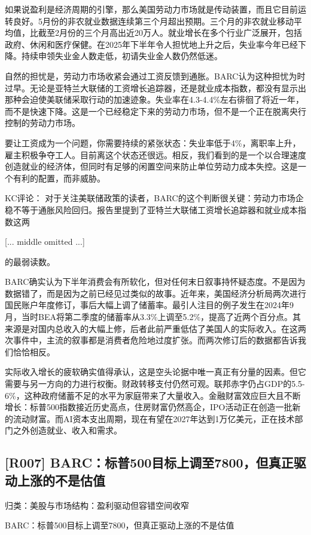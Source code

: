 \documentclass[11pt]{ctexart}
\begin{document}
如果说盈利是经济周期的引擎，那么美国劳动力市场就是传动装置，而且它目前运转良好。5月份的非农就业数据连续第三个月超出预期。三个月的非农就业移动平均值，比截至2月份的三个月高出近20万人。就业增长在多个行业广泛展开，包括政府、休闲和医疗保健。在2025年下半年令人担忧地上升之后，失业率今年已经下降。持续申领失业金人数走低，初请失业金人数仍然低迷。

自然的担忧是，劳动力市场收紧会通过工资反馈到通胀。BARC认为这种担忧为时过早。无论是亚特兰大联储的工资增长追踪器，还是就业成本指数，都没有显示出那种会迫使美联储采取行动的加速迹象。失业率在4.3-4.4\%左右徘徊了将近一年，而不是快速下降。这是一个已经稳定下来的劳动力市场，但不是一个正在脱离央行控制的劳动力市场。

要让工资成为一个问题，你需要持续的紧张状态：失业率低于4\%，离职率上升，雇主积极争夺工人。目前离这个状态还很远。相反，我们看到的是一个以合理速度创造就业的经济体，但同时有足够的闲置空间来防止单位劳动力成本失控。这是一个有利的配置，而非威胁。

KC评论： 对于关注美联储政策的读者，BARC的这个判断很关键：劳动力市场企稳不等于通胀风险回归。报告里提到了亚特兰大联储工资增长追踪器和就业成本指数这两

[... middle omitted ...]

的最弱读数。

BARC确实认为下半年消费会有所软化，但对任何末日叙事持怀疑态度。不是因为数据错了，而是因为之前已经见过类似的故事。近年来，美国经济分析局两次进行国民账户年度修订，事后大幅上调了储蓄率。最引人注目的例子发生在2024年9月，当时BEA将第二季度的储蓄率从3.3\%上调至5.2\%，提高了近两个百分点。其来源是对国内总收入的大幅上修，后者此前严重低估了美国人的实际收入。在这两次事件中，主流的叙事都是消费者危险地过度扩张。而两次修订后的数据都告诉我们恰恰相反。

实际收入增长的疲软确实值得承认，这是空头论据中唯一真正有分量的因素。但它需要与另一方向的力进行权衡。财政转移支付仍然可观。联邦赤字仍占GDP的5.5-6\%，这种政府储蓄不足的水平为家庭带来了大量收入。金融财富效应巨大且不断增长：标普500指数接近历史高点，住房财富仍然高企，IPO活动正在创造一批新的流动财富。而AI资本支出周期，现在有望在2027年达到1万亿美元，正在技术部门之外创造就业、收入和需求。

\subsection{[R007] BARC：标普500目标上调至7800，但真正驱动上涨的不是估值}
{\small\color{refgray}归类：美股与市场结构：盈利驱动但容错空间收窄}

BARC：标普500目标上调至7800，但真正驱动上涨的不是估值
\end{document}
